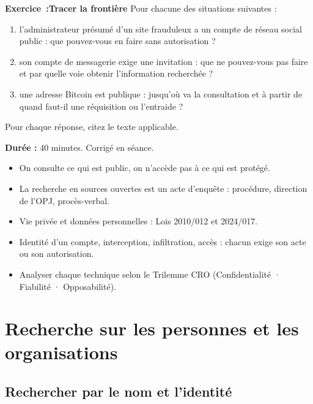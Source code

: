 \begin{boxexo}
\textbf{Exercice~:Tracer la frontière}
Pour chacune des situations suivantes :
\begin{enumerate}
\item l'administrateur présumé d'un site frauduleux a un compte de réseau social public : que pouvez-vous en faire sans autorisation ?
\item son compte de messagerie exige une invitation : que ne pouvez-vous pas faire et par quelle voie obtenir l'information recherchée ?
\item une adresse Bitcoin est publique : jusqu'où va la consultation et à partir de quand faut-il une réquisition ou l'entraide ?
\end{enumerate}
Pour chaque réponse, citez le texte applicable.

\textbf{Durée :} 40 minutes. Corrigé en séance.
\end{boxexo}

\begin{boxresume}
\begin{itemize}
\item On consulte ce qui est public, on n'accède pas à ce qui est protégé.
\item La recherche en sources ouvertes est un acte d'enquête : procédure, direction de l'OPJ, procès-verbal.
\item Vie privée et données personnelles : Lois 2010/012 et 2024/017.
\item Identité d'un compte, interception, infiltration, accès : chacun exige son acte ou son autorisation.
\item Analyser chaque technique selon le Trilemme CRO (Confidentialité · Fiabilité · Opposabilité).
\end{itemize}
\end{boxresume}

\section{Recherche sur les personnes et les organisations}

\subsection{Rechercher par le nom et l'identité}

